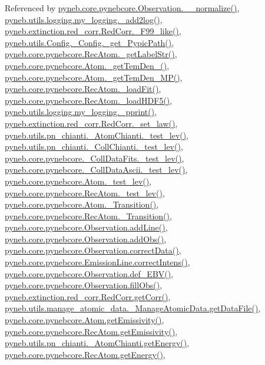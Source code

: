 Referenced by \hyperlink{pynebcore_8py_source_l04007}{pyneb.\-core.\-pynebcore.\-Observation.\-\_\-\-\_\-normalize()}, \hyperlink{logging_8py_source_l00059}{pyneb.\-utils.\-logging.\-my\-\_\-logging.\-\_\-add2log()}, \hyperlink{red__corr_8py_source_l00658}{pyneb.\-extinction.\-red\-\_\-corr.\-Red\-Corr.\-\_\-\-F99\-\_\-like()}, \hyperlink{_config_8py_source_l00115}{pyneb.\-utils.\-Config.\-\_\-\-Config.\-\_\-get\-\_\-\-Pypic\-Path()}, \hyperlink{pynebcore_8py_source_l02970}{pyneb.\-core.\-pynebcore.\-Rec\-Atom.\-\_\-get\-Label\-Str()}, \hyperlink{pynebcore_8py_source_l01869}{pyneb.\-core.\-pynebcore.\-Atom.\-\_\-get\-Tem\-Den\-\_()}, \hyperlink{pynebcore_8py_source_l02046}{pyneb.\-core.\-pynebcore.\-Atom.\-\_\-get\-Tem\-Den\-\_\-\-M\-P()}, \hyperlink{pynebcore_8py_source_l02754}{pyneb.\-core.\-pynebcore.\-Rec\-Atom.\-\_\-load\-Fit()}, \hyperlink{pynebcore_8py_source_l02714}{pyneb.\-core.\-pynebcore.\-Rec\-Atom.\-\_\-load\-H\-D\-F5()}, \hyperlink{logging_8py_source_l00051}{pyneb.\-utils.\-logging.\-my\-\_\-logging.\-\_\-pprint()}, \hyperlink{red__corr_8py_source_l00176}{pyneb.\-extinction.\-red\-\_\-corr.\-Red\-Corr.\-\_\-set\-\_\-law()}, \hyperlink{pn__chianti_8py_source_l00304}{pyneb.\-utils.\-pn\-\_\-chianti.\-\_\-\-Atom\-Chianti.\-\_\-test\-\_\-lev()}, \hyperlink{pn__chianti_8py_source_l00472}{pyneb.\-utils.\-pn\-\_\-chianti.\-\_\-\-Coll\-Chianti.\-\_\-test\-\_\-lev()}, \hyperlink{pynebcore_8py_source_l00677}{pyneb.\-core.\-pynebcore.\-\_\-\-Coll\-Data\-Fits.\-\_\-test\-\_\-lev()}, \hyperlink{pynebcore_8py_source_l01045}{pyneb.\-core.\-pynebcore.\-\_\-\-Coll\-Data\-Ascii.\-\_\-test\-\_\-lev()}, \hyperlink{pynebcore_8py_source_l01525}{pyneb.\-core.\-pynebcore.\-Atom.\-\_\-test\-\_\-lev()}, \hyperlink{pynebcore_8py_source_l02672}{pyneb.\-core.\-pynebcore.\-Rec\-Atom.\-\_\-test\-\_\-lev()}, \hyperlink{pynebcore_8py_source_l01433}{pyneb.\-core.\-pynebcore.\-Atom.\-\_\-\-Transition()}, \hyperlink{pynebcore_8py_source_l02812}{pyneb.\-core.\-pynebcore.\-Rec\-Atom.\-\_\-\-Transition()}, \hyperlink{pynebcore_8py_source_l03558}{pyneb.\-core.\-pynebcore.\-Observation.\-add\-Line()}, \hyperlink{pynebcore_8py_source_l03589}{pyneb.\-core.\-pynebcore.\-Observation.\-add\-Obs()}, \hyperlink{pynebcore_8py_source_l04028}{pyneb.\-core.\-pynebcore.\-Observation.\-correct\-Data()}, \hyperlink{pynebcore_8py_source_l03447}{pyneb.\-core.\-pynebcore.\-Emission\-Line.\-correct\-Intens()}, \hyperlink{pynebcore_8py_source_l03983}{pyneb.\-core.\-pynebcore.\-Observation.\-def\-\_\-\-E\-B\-V()}, \hyperlink{pynebcore_8py_source_l03574}{pyneb.\-core.\-pynebcore.\-Observation.\-fill\-Obs()}, \hyperlink{red__corr_8py_source_l00211}{pyneb.\-extinction.\-red\-\_\-corr.\-Red\-Corr.\-get\-Corr()}, \hyperlink{manage__atomic__data_8py_source_l00297}{pyneb.\-utils.\-manage\-\_\-atomic\-\_\-data.\-\_\-\-Manage\-Atomic\-Data.\-get\-Data\-File()}, \hyperlink{pynebcore_8py_source_l01782}{pyneb.\-core.\-pynebcore.\-Atom.\-get\-Emissivity()}, \hyperlink{pynebcore_8py_source_l02990}{pyneb.\-core.\-pynebcore.\-Rec\-Atom.\-get\-Emissivity()}, \hyperlink{pn__chianti_8py_source_l00366}{pyneb.\-utils.\-pn\-\_\-chianti.\-\_\-\-Atom\-Chianti.\-get\-Energy()}, \hyperlink{pynebcore_8py_source_l02927}{pyneb.\-core.\-pynebcore.\-Rec\-Atom.\-get\-Energy()}, 